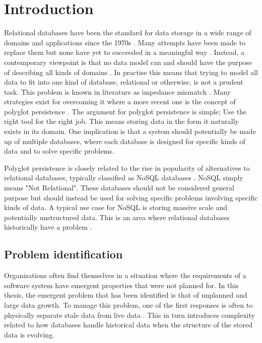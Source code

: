 \chapter{Introduction}
Relational databases have been the standard for data storage in a wide range of domains and applications since the 1970s \cite{Codd}. Many attempts have been made to replace them but none have yet to succeeded in a meaningful way \cite{NoSQLDistilled}. Instead, a contemporary viewpoint is that no data model can and should have the purpose of describing all kinds of domains \cite{NoSQLDistilled, NoSQLSurvey}. In practise this means that trying to model all data to fit into one kind of database, relational or otherwise, is not a prudent task. This problem is known in literature as impedance mismatch \cite{ORM}. Many strategies \cite{ORM} exist for overcoming it where a more recent one is the concept of polyglot persistence \cite{NoSQLDistilled}. The argument for polyglot persistence is simple; Use the right tool for the right job. This means storing data in the form it naturally exists in its domain. One implication is that a system should potentially be made up of multiple databases, where each database is designed for specific kinds of data and to solve specific problems.

Polyglot persistence is closely related to the rise in popularity of alternatives to relational databases, typically classified as NoSQL databases \cite{Catell}. NoSQL simply means "Not Relational". These databases should not be considered general purpose \cite{Catell, polyglotms} but should instead be used for solving specific problems involving specific kinds of data. A typical use case for NoSQL is storing massive scale and potentially unstructured data. This is an area where relational databases historically have a problem \cite{Catell}.

\section{Problem identification}

Organizations often find themselves in a situation where the requirements of a software system have emergent properties that were not planned for. In this thesis, the emergent problem that has been identified is that of unplanned and large data growth. To manage this problem, one of the first responses is often to physically separate stale data from live data \cite{Mullins}. This in turn introduces complexity related to how databases handle historical data when the structure of the stored data is evolving. 

